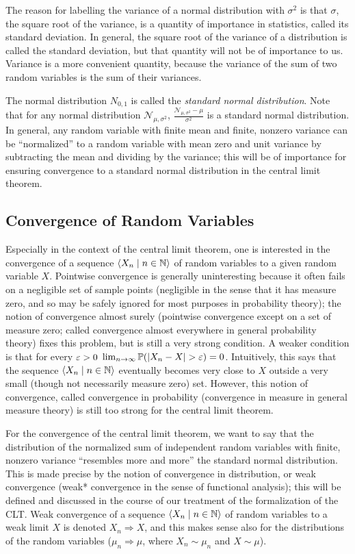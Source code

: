 \documentclass[leqno]{article}
\theoremstyle{definition}
\newcommand{\bldseq}[2]{\langle{#1}\mid{#2}\rangle}
\begin{document}
The reason for labelling the variance of a normal distribution with $\sigma^2$ is that $\sigma$, the square root of the variance, is a quantity of importance in statistics, called its standard deviation. In general, the square root of the variance of a distribution is called the standard deviation, but that quantity will not be of importance to us. Variance is a more convenient quantity, because the variance of the sum of two random variables is the sum of their variances.

The normal distribution $N_{0,1}$ is called the {\em standard normal distribution}. Note that for any normal distribution $\mathcal N_{\mu, \sigma^2}$, $\frac{\mathcal N_{\mu, \sigma^2} - \mu}{\sigma^2}$ is a standard normal distribution. In general, any random variable with finite mean and finite, nonzero variance can be ``normalized'' to a random variable with mean zero and unit variance by subtracting the mean and dividing by the variance; this will be of importance for ensuring convergence to a standard normal distribution in the central limit theorem.

\subsection{Convergence of Random Variables}

Especially in the context of the central limit theorem, one is interested in the convergence of a sequence $\bldseq{X_n}{n \in \N}$ of random variables to a given random variable $X$. Pointwise convergence is generally uninteresting because it often fails on a negligible set of sample points (negligible in the sense that it has measure zero, and so may be safely ignored for most purposes in probability theory); the notion of convergence almost surely (pointwise convergence except on a set of measure zero; called convergence almost everywhere in general probability theory) fixes this problem, but is still a very strong condition. A weaker condition is that for every $\varepsilon > 0$ $\lim_{n \rightarrow \infty} \mathbb{P}(|X_n - X| > \varepsilon) = 0$. Intuitively, this says that the sequence $\bldseq{X_n}{n \in \N}$ eventually becomes very close to $X$ outside a very small (though not necessarily measure zero) set. However, this notion of convergence, called convergence in probability (convergence in measure in general measure theory) is still too strong for the central limit theorem.

For the convergence of the central limit theorem, we want to say that the distribution of the normalized sum of independent random variables with finite, nonzero variance ``resembles more and more'' the standard normal distribution. This is made precise by the notion of convergence in distribution, or weak convergence (weak* convergence in the sense of functional analysis); this will be defined and discussed in the course of our treatment of the formalization of the CLT. Weak convergence of a sequence $\bldseq{X_n}{n \in \N}$ of random variables to a weak limit $X$ is denoted $X_n \Rightarrow X$, and this makes sense also for the distributions of the random variables ($\mu_n \Rightarrow \mu$, where $X_n \sim \mu_n$ and $X \sim \mu$).
\end{document}
